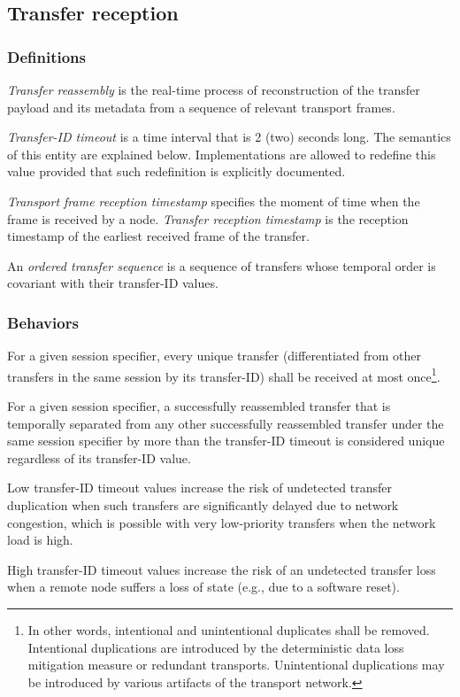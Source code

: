 \subsection{Transfer reception}

\subsubsection{Definitions}

\emph{Transfer reassembly} is the real-time process of reconstruction of the transfer payload and its metadata from
a sequence of relevant transport frames.

\emph{Transfer-ID timeout} is a time interval that is 2 (two) seconds long.
The semantics of this entity are explained below.
Implementations are allowed to redefine this value provided that such redefinition is explicitly documented.

\emph{Transport frame reception timestamp} specifies the moment of time when the frame is received by a node.
\emph{Transfer reception timestamp} is the reception timestamp of the earliest received frame of the transfer.

An \emph{ordered transfer sequence} is a sequence of transfers whose temporal order is
covariant with their transfer-ID values.

\subsubsection{Behaviors}

For a given session specifier, every unique transfer
(differentiated from other transfers in the same session by its transfer-ID)
shall be received at most once\footnote{%
    In other words, intentional and unintentional duplicates shall be removed.
    Intentional duplications are introduced by the deterministic data loss mitigation measure or redundant transports.
    Unintentional duplications may be introduced by various artifacts of the transport network.
}.

For a given session specifier, a successfully reassembled transfer that is temporally separated from
any other successfully reassembled transfer under the same session specifier by more than the transfer-ID timeout
is considered unique regardless of its transfer-ID value.

\begin{remark}
    Low transfer-ID timeout values increase the risk of undetected transfer duplication when such transfers
    are significantly delayed due to network congestion,
    which is possible with very low-priority transfers when the network load is high.

    High transfer-ID timeout values increase the risk of an undetected transfer loss
    when a remote node suffers a loss of state (e.g., due to a software reset).
\end{remark}


